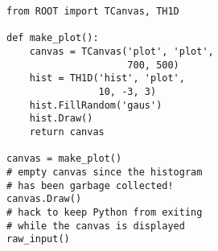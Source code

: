 \begin{footnotesize}
\begin{verbatim}
from ROOT import TCanvas, TH1D

def make_plot():
    canvas = TCanvas('plot', 'plot',
                     700, 500)
    hist = TH1D('hist', 'plot',
                10, -3, 3)
    hist.FillRandom('gaus')
    hist.Draw()
    return canvas

canvas = make_plot()
# empty canvas since the histogram
# has been garbage collected!
canvas.Draw()
# hack to keep Python from exiting
# while the canvas is displayed
raw_input()
\end{verbatim}
\end{footnotesize}
